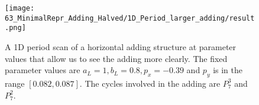 \begin{figure}
	\centering
	\texttt{[image: 63\_MinimalRepr\_Adding\_Halved/1D\_Period\_larger\_adding/result.png]}
	\caption{
		A 1D period scan of a horizontal adding structure at parameter values that allow us to see the adding more clearly.
		The fixed parameter values are $a_L = 1, b_L = 0.8, p_x = -0.39$ and $p_y$ is in the range $[0.082, 0.087]$.
		The cycles involved in the adding are $P_7^3$ and $P_7^2$.
	}
	\label{fig:minrep.adding1.large.adding}
\end{figure}


%
%
%
%
